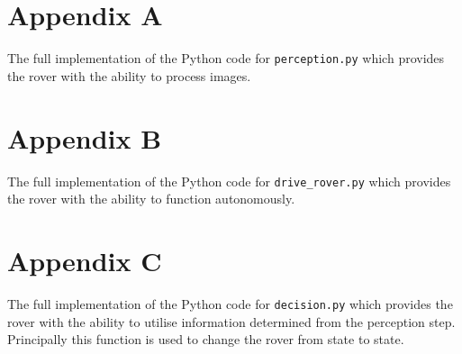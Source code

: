\documentclass[a4paper]{article}
\begin{document}
\newpage

\section{Appendix A}

\lstset{
	frame       = single,
	numbers     = left,
	showspaces  = false,
	showstringspaces    = false
}

The full implementation of the Python code for \verb|perception.py| which provides the rover with the ability to process images.

\tiny


\newpage

\section{Appendix B}

The full implementation of the Python code for \verb|drive_rover.py| which provides the rover with the ability to function autonomously.

\tiny


\newpage

\section{Appendix C}

The full implementation of the Python code for \verb|decision.py| which provides the rover with the ability to utilise information determined from the perception step. Principally this function is used to change the rover from state to state.

\tiny

\end{document}
